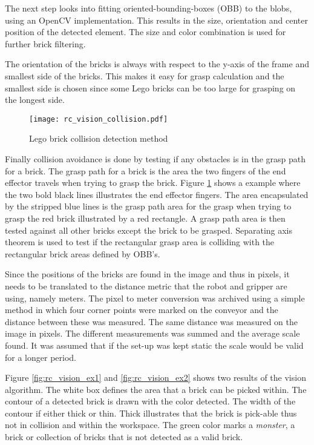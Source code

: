 The next step looks into fitting oriented-bounding-boxes (OBB) to the blobs, using an OpenCV\cite{opencv} implementation. This results in the size, orientation and center position of the detected element. The size and color combination is used for further brick filtering.

The orientation of the bricks is always with respect to the y-axis of the frame and smallest side of the bricks. This makes it easy for grasp calculation and the smallest side is chosen since some Lego bricks can be too large for grasping on the longest side. 
	
	\begin{figure}[H]
		\centering
	    \texttt{[image: rc\_vision\_collision.pdf]}
	    \caption{Lego brick collision detection method}
		\label{fig:rc_vision_collision}
	\end{figure}
	
Finally collision avoidance is done by testing if any obstacles is in the grasp path for a brick. The grasp path for a brick is the area the two fingers of the end effector travels when trying to grasp the brick. Figure \ref{fig:rc_vision_collision} shows a example where the two bold black lines illustrates the end effector fingers. The area encapsulated by the stripped blue lines is the grasp path area for the grasp when trying to grasp the red brick illustrated by a red rectangle. A grasp path area is then tested against all other bricks except the brick to be grasped. Separating axis theorem\cite{Gottschalk:1996:OHS:237170.237244} is used to test if the rectangular grasp area is colliding with the rectangular brick areas defined by OBB's.

Since the positions of the bricks are found in the image and thus in pixels, it needs to be translated to the distance metric that the robot and gripper are using, namely meters. The pixel to meter conversion was archived using a simple method in which four corner points were marked on the conveyor and the distance between these was measured. The same distance was measured on the image in pixels. The different measurements was summed and the average scale found. It was assumed that if the set-up was kept static the scale would be valid for a longer period.

Figure \ref{fig:rc_vision_ex1} and \ref{fig:rc_vision_ex2} shows two results of the vision algorithm. The white box defines the area that a brick can be picked within. The contour of a detected brick is drawn with the color detected. The width of the contour if either thick or thin. Thick illustrates that the brick is pick-able thus not in collision and within the workspace. The green color marks a \textit{monster}, a brick or collection of bricks that is not detected as a valid brick. 

